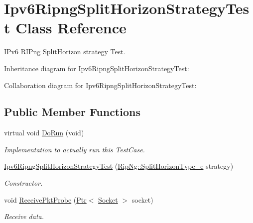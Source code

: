 \hypertarget{classIpv6RipngSplitHorizonStrategyTest}{}\section{Ipv6\+Ripng\+Split\+Horizon\+Strategy\+Test Class Reference}
\label{classIpv6RipngSplitHorizonStrategyTest}


I\+Pv6 R\+I\+Png Split\+Horizon strategy Test.  




Inheritance diagram for Ipv6\+Ripng\+Split\+Horizon\+Strategy\+Test\+:


Collaboration diagram for Ipv6\+Ripng\+Split\+Horizon\+Strategy\+Test\+:
\subsection*{Public Member Functions}
\begin{DoxyCompactItemize}
\item 
virtual void \hyperlink{classIpv6RipngSplitHorizonStrategyTest_a8e3dad1362842eedd70ef21bff0a75c5}{Do\+Run} (void)
\begin{DoxyCompactList}\small\item\em Implementation to actually run this Test\+Case. \end{DoxyCompactList}\item 
\hyperlink{classIpv6RipngSplitHorizonStrategyTest_a2ba828882f23e1909348951a8154c46d}{Ipv6\+Ripng\+Split\+Horizon\+Strategy\+Test} (\hyperlink{classns3_1_1RipNg_a2baa3148870b411bccfe688079fb40a7}{Rip\+Ng\+::\+Split\+Horizon\+Type\+\_\+e} strategy)
\begin{DoxyCompactList}\small\item\em Constructor. \end{DoxyCompactList}\item 
void \hyperlink{classIpv6RipngSplitHorizonStrategyTest_ad4f2c6c48e7eca051598285035aaf8ec}{Receive\+Pkt\+Probe} (\hyperlink{classns3_1_1Ptr}{Ptr}$<$ \hyperlink{classns3_1_1Socket}{Socket} $>$ socket)
\begin{DoxyCompactList}\small\item\em Receive data. \end{DoxyCompactList}\end{DoxyCompactItemize}

